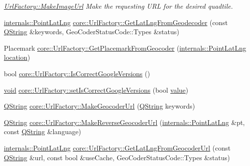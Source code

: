 \begin{DoxyCompactItemize}
\begin{DoxyCompactList}\small\item\em \hyperlink{group___o_p_map_widget_ga7339895a709cbc83dfac87ec5e1a42ff}{Url\-Factory\-::\-Make\-Image\-Url} Make the requesting U\-R\-L for the desired quadtile. \end{DoxyCompactList}\item 
\hyperlink{structinternals_1_1_point_lat_lng}{internals\-::\-Point\-Lat\-Lng} \hyperlink{group___o_p_map_widget_ga39ab1784711725813c6e90f8be8557b5}{core\-::\-Url\-Factory\-::\-Get\-Lat\-Lng\-From\-Geodecoder} (const \hyperlink{group___u_a_v_objects_plugin_gab9d252f49c333c94a72f97ce3105a32d}{Q\-String} \&keywords, Geo\-Coder\-Status\-Code\-::\-Types \&status)
\item 
Placemark \hyperlink{group___o_p_map_widget_ga3490a9f0d7fad2058ec2e9a04e7c7f4e}{core\-::\-Url\-Factory\-::\-Get\-Placemark\-From\-Geocoder} (\hyperlink{structinternals_1_1_point_lat_lng}{internals\-::\-Point\-Lat\-Lng} \hyperlink{glext_8h_a6f0165ed903f22b8bb600c3e0b628e73}{location})
\item 
bool \hyperlink{group___o_p_map_widget_ga5ccccf5ffb4b44422b6ca9596d0972f9}{core\-::\-Url\-Factory\-::\-Is\-Correct\-Google\-Versions} ()
\item 
\hyperlink{group___u_a_v_objects_plugin_ga444cf2ff3f0ecbe028adce838d373f5c}{void} \hyperlink{group___o_p_map_widget_ga7770edaf0b058ba1317da2a627219fb1}{core\-::\-Url\-Factory\-::set\-Is\-Correct\-Google\-Versions} (bool \hyperlink{glext_8h_aa0e2e9cea7f208d28acda0480144beb0}{value})
\item 
\hyperlink{group___u_a_v_objects_plugin_gab9d252f49c333c94a72f97ce3105a32d}{Q\-String} \hyperlink{group___o_p_map_widget_ga972a8b02da4bbabc676cf8c0aecff2da}{core\-::\-Url\-Factory\-::\-Make\-Geocoder\-Url} (\hyperlink{group___u_a_v_objects_plugin_gab9d252f49c333c94a72f97ce3105a32d}{Q\-String} keywords)
\item 
\hyperlink{group___u_a_v_objects_plugin_gab9d252f49c333c94a72f97ce3105a32d}{Q\-String} \hyperlink{group___o_p_map_widget_gad12026ac0e1b17ce9cdbd8da9b4521db}{core\-::\-Url\-Factory\-::\-Make\-Reverse\-Geocoder\-Url} (\hyperlink{structinternals_1_1_point_lat_lng}{internals\-::\-Point\-Lat\-Lng} \&pt, const \hyperlink{group___u_a_v_objects_plugin_gab9d252f49c333c94a72f97ce3105a32d}{Q\-String} \&language)
\item 
\hyperlink{structinternals_1_1_point_lat_lng}{internals\-::\-Point\-Lat\-Lng} \hyperlink{group___o_p_map_widget_ga5fcebca86495c19cd0feda82e7bb756d}{core\-::\-Url\-Factory\-::\-Get\-Lat\-Lng\-From\-Geocoder\-Url} (const \hyperlink{group___u_a_v_objects_plugin_gab9d252f49c333c94a72f97ce3105a32d}{Q\-String} \&url, const bool \&use\-Cache, Geo\-Coder\-Status\-Code\-::\-Types \&status)

\end{DoxyCompactItemize}
